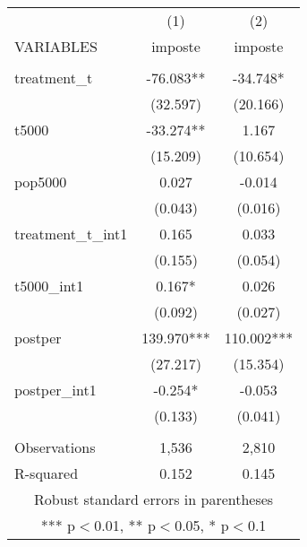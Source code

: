 \documentclass[]{article}
\begin{document}
\begin{tabular}{lcc} \hline
 & (1) & (2) \\
VARIABLES & imposte & imposte \\ \hline
 &  &  \\
treatment\_t & -76.083** & -34.748* \\
 & (32.597) & (20.166) \\
t5000 & -33.274** & 1.167 \\
 & (15.209) & (10.654) \\
pop5000 & 0.027 & -0.014 \\
 & (0.043) & (0.016) \\
treatment\_t\_int1 & 0.165 & 0.033 \\
 & (0.155) & (0.054) \\
t5000\_int1 & 0.167* & 0.026 \\
 & (0.092) & (0.027) \\
postper & 139.970*** & 110.002*** \\
 & (27.217) & (15.354) \\
postper\_int1 & -0.254* & -0.053 \\
 & (0.133) & (0.041) \\
 &  &  \\
Observations & 1,536 & 2,810 \\
 R-squared & 0.152 & 0.145 \\ \hline
\multicolumn{3}{c}{ Robust standard errors in parentheses} \\
\multicolumn{3}{c}{ *** p$<$0.01, ** p$<$0.05, * p$<$0.1} \\
\end{tabular}
\end{document}
